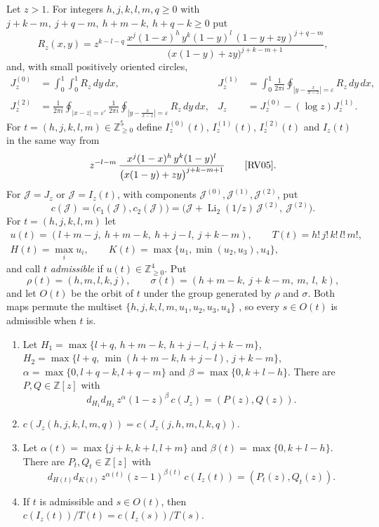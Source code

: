 \documentclass{amsart}
\numberwithin{equation}{section}
\numberwithin{table}{section}
\newcommand{\Li}{\operatorname{Li}}
\newcommand{\Z}{\mathbb{Z}}
\begin{document}
Let $z>1$. For integers $h,j,k,l,m,q\ge0$ with
$j+k-m,\ j+q-m,\ h+m-k,\ h+q-k\ge0$ put
\[
R_z(x,y)=z^{k-l-q}\,
\frac{x^j(1-x)^h\,y^k(1-y)^l\,(1-y+zy)^{j+q-m}}
{\bigl(x(1-y)+zy\bigr)^{j+k-m+1}},
\]
and, with small positively oriented circles,
\begin{align*}
J_z^{(0)}&=\int_0^1\!\!\int_0^1R_z\,dy\,dx,&
J_z^{(1)}&=\int_0^1\frac1{2\pi i}\oint_{|y-\frac{x}{x-z}|=\varepsilon}R_z\,dy\,dx,\\
J_z^{(2)}&=\frac1{2\pi i}\oint_{|x-z|=\varepsilon'}\frac1{2\pi i}
\oint_{|y-\frac{x}{x-z}|=\varepsilon}R_z\,dy\,dx,&
J_z&=J_z^{(0)}-(\log z)J_z^{(1)}.
\end{align*}
For $t=(h,j,k,l,m)\in\Z_{\ge0}^5$ define $I_z^{(0)}(t)$, $I_z^{(1)}(t)$,
$I_z^{(2)}(t)$ and $I_z(t)$ in the same way from
\[
z^{-l-m}\,\frac{x^j(1-x)^h\,y^k(1-y)^l}{\bigl(x(1-y)+zy\bigr)^{j+k-m+1}}
\qquad\text{\cite[(2.1)--(2.4)]{RV05}}.
\]
For $\mathcal J=J_z$ or $\mathcal J=I_z(t)$, with components
$\mathcal J^{(0)},\mathcal J^{(1)},\mathcal J^{(2)}$, put
\[
c(\mathcal J)=\bigl(c_1(\mathcal J),c_2(\mathcal J)\bigr)
=\bigl(\mathcal J+\Li_2(1/z)\,\mathcal J^{(2)},\ \mathcal J^{(2)}\bigr).
\]
For $t=(h,j,k,l,m)$ let
\begin{gather*}
u(t)=(l+m-j,\ h+m-k,\ h+j-l,\ j+k-m),\qquad T(t)=h!\,j!\,k!\,l!\,m!,\\
H(t)=\max_iu_i,\qquad K(t)=\max\{u_1,\min(u_2,u_3),u_4\},
\end{gather*}
and call $t$ \emph{admissible} if $u(t)\in\Z_{\ge0}^4$. Put
\[
\rho(t)=(h,m,l,k,j),\qquad \sigma(t)=(h+m-k,\ j+k-m,\ m,\ l,\ k),
\]
and let $O(t)$ be the orbit of $t$ under the group generated by $\rho$ and
$\sigma$. Both maps permute the multiset
$\{h,j,k,l,m,u_1,u_2,u_3,u_4\}$ \cite[(3.2), (3.15)]{RV05}, so every
$s\in O(t)$ is admissible when $t$ is.

\begin{enumerate}
\item[(F1)] \cite[Lemma 2.1]{VZ} Let
$H_1=\max\{l+q,\,h+m-k,\,h+j-l,\,j+k-m\}$,
$H_2=\max\{l+q,\,\min(h+m-k,h+j-l),\,j+k-m\}$,
$\alpha=\max\{0,l+q-k,l+q-m\}$ and $\beta=\max\{0,k+l-h\}$. There are
$P,Q\in\Z[z]$ with
\[
d_{H_1}d_{H_2}\,z^{\alpha}(1-z)^{\beta}\,c(J_z)=(P(z),Q(z)) .
\]
\item[(F2)] \cite[Lemma 3.1]{VZ} $c(J_z(h,j,k,l,m,q))=c(J_z(j,h,m,l,k,q))$.
\item[(F3)] \cite[Theorem 2.1 and (2.9)]{RV05} Let
$\alpha(t)=\max\{j+k,k+l,l+m\}$ and $\beta(t)=\max\{0,k+l-h\}$. There are
$P_t,Q_t\in\Z[z]$ with
\[
d_{H(t)}d_{K(t)}\,z^{\alpha(t)}(z-1)^{\beta(t)}\,c(I_z(t))=(P_t(z),Q_t(z)) .
\]
\item[(F4)] \cite[(3.10)--(3.16)]{RV05} If $t$ is admissible and $s\in O(t)$,
then $c(I_z(t))/T(t)=c(I_z(s))/T(s)$.
\end{enumerate}
\end{document}
